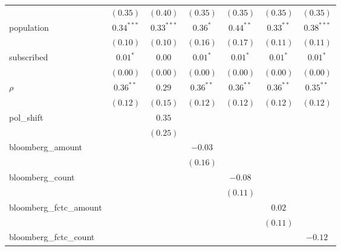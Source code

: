 \begin{table}[!h]
\begin{center}
\begin{tabular}{l c c c c c c }
                        & $(0.35)$      & $(0.40)$      & $(0.35)$      & $(0.35)$      & $(0.35)$      & $(0.35)$      \\
population              & $0.34^{***}$  & $0.33^{***}$  & $0.36^{*}$    & $0.44^{**}$   & $0.33^{**}$   & $0.38^{***}$  \\
                        & $(0.10)$      & $(0.10)$      & $(0.16)$      & $(0.17)$      & $(0.11)$      & $(0.11)$      \\
subscribed              & $0.01^{*}$    & $0.00$        & $0.01^{*}$    & $0.01^{*}$    & $0.01^{*}$    & $0.01^{*}$    \\
                        & $(0.00)$      & $(0.00)$      & $(0.00)$      & $(0.00)$      & $(0.00)$      & $(0.00)$      \\
$\rho$                  & $0.36^{**}$   & $0.29$        & $0.36^{**}$   & $0.36^{**}$   & $0.36^{**}$   & $0.35^{**}$   \\
                        & $(0.12)$      & $(0.15)$      & $(0.12)$      & $(0.12)$      & $(0.12)$      & $(0.12)$      \\
pol\_shift              &               & $0.35$        &               &               &               &               \\
                        &               & $(0.25)$      &               &               &               &               \\
bloomberg\_amount       &               &               & $-0.03$       &               &               &               \\
                        &               &               & $(0.16)$      &               &               &               \\
bloomberg\_count        &               &               &               & $-0.08$       &               &               \\
                        &               &               &               & $(0.11)$      &               &               \\
bloomberg\_fctc\_amount &               &               &               &               & $0.02$        &               \\
                        &               &               &               &               & $(0.11)$      &               \\
bloomberg\_fctc\_count  &               &               &               &               &               & $-0.12$       \\

\end{tabular}
\end{center}
\end{table}
